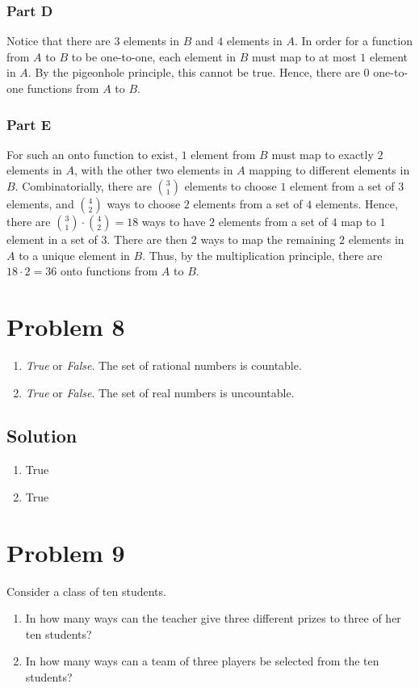 \documentclass[table]{article}
\begin{document}
\subsubsection{Part D}
Notice that there are $3$ elements in $B$ and $4$ elements in $A$. In order for a function from $A$ to $B$ to be one-to-one, each element in $B$ must map to at most $1$ element in $A$. By the pigeonhole principle, this cannot be true. Hence, there are $0$ one-to-one functions from $A$ to $B$.
\subsubsection{Part E}
For such an onto function to exist, $1$ element from $B$ must map to exactly $2$ elements in $A$, with the other two elements in $A$ mapping to different elements in $B$. Combinatorially, there are $3 \choose 1$ elements to choose $1$ element from a set of $3$ elements, and $4 \choose 2$ ways to choose $2$ elements from a set of $4$ elements. Hence, there are ${3 \choose 1} \cdot {4 \choose 2}=18$ ways to have $2$ elements from a set of $4$ map to $1$ element in a set of $3$. There are then $2$ ways to map the remaining $2$ elements in $A$ to a unique element in $B$. Thus, by the multiplication principle, there are $18 \cdot 2 = 36$ onto functions from $A$ to $B$.
\section{Problem 8}
\begin{enumerate}[nosep,label=\alph*)]
\item \textit{True} or \textit{False}. The set of rational numbers is countable.
\item \textit{True} or \textit{False}. The set of real numbers is uncountable.
\end{enumerate}
\subsection{Solution}
\begin{enumerate}[nosep,label=\alph*)]
\item True
\item True
\end{enumerate}
\section{Problem 9}
Consider a class of ten students.
\begin{enumerate}[nosep,label=\alph*)]
\item In how many ways can the teacher give three different prizes to three of her ten students?
\item In how many ways can a team of three players be selected from the ten students?
\end{enumerate}
\end{document}
